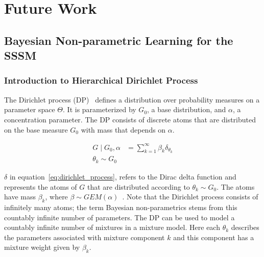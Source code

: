 \section{Future Work}
\subsection{Bayesian Non-parametric Learning for the SSSM}\label{sec:non-parameteric}
\subsubsection{Introduction to Hierarchical Dirichlet Process}
The Dirichlet process (DP)~\citep{ferguson1973bayesian} defines a distribution over probability measures on a parameter space $\Theta$. It is parameterized by $G_0$, a base distribution, and $\alpha$, a concentration parameter. The DP consists of discrete atoms that are distributed on the base measure $G_0$ with mass that depends on $\alpha$.

\begin{equation}\label{eq:dirichlet_process}
  \begin{split}
    G \mid G_0, \alpha &= \sum\limits_{k=1}^{\infty} \beta_k \delta_{\theta_k} \\
    \theta_k \sim G_0
  \end{split}
\end{equation}

$\delta$ in equation~\ref{eq:dirichlet_process}, refers to the Dirac delta function and represents the atoms of $G$ that are distributed according to $\theta_k \sim G_0$. The atoms have mass $\beta_k$, where $\beta \sim GEM(\alpha)$~\citep{neal2000markov}. Note that the Dirichlet process consists of infinitely many atoms; the term Bayesian non-parametrics stems from this countably infinite number of parameters. The DP can be used to model a countably infinite number of mixtures in a mixture model. Here each $\theta_k$ describes the parameters associated with mixture component $k$ and this component has a mixture weight given by $\beta_k$.

